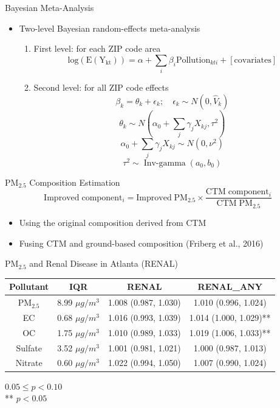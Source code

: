 \documentclass[handout]{beamer} %
\begin{document}
\begin{frame}{Bayesian Meta-Analysis}
    \begin{itemize}
       \item Two-level Bayesian random-effects meta-analysis
        \begin{enumerate}
            \item First level: for each ZIP code area$$ \mathrm{log(E(Y_{kt}))}=\alpha+\sum_i\beta_i\mathrm{Pollution}_{kti}+[\mathrm{covariates}]$$
            \item Second level: for all ZIP code effects
            $$\beta_k=\theta_k+\epsilon_k; \quad \epsilon_k\sim N(0, \hat{V}_k)$$
            $$\theta_k\sim N(\alpha_0+\sum_j\gamma_jX_{kj}, \tau^2)$$
            $$\alpha_0+\sum_j\gamma_jX_{kj} \sim N(0, \nu^2)$$
            $$\tau^2\sim \operatorname{Inv-gamma}(a_0, b_0)$$
        \end{enumerate}
    \end{itemize}
\end{frame}

\begin{frame}{PM$_{2.5}$ Composition Estimation}
    \begin{equation*}
        \mathrm{Improved\;component_\mathit{i}=Improved\;PM_{2.5}\times\frac{CTM\;component_\mathit{i}}{CTM\;PM_{2.5}}}
    \end{equation*}
    \begin{itemize}
        \item Using the original composition derived from CTM
        \item Fusing CTM and ground-based composition (Friberg et al., 2016)
    \end{itemize}
\end{frame}

\begin{frame}{PM$_{2.5}$ and Renal Disease in Atlanta (RENAL)}
    \begin{table}
        \small
        \centering
        \begin{tabular}{c|c|c|c}
            \hline
            Pollutant & IQR & RENAL & RENAL\_ANY \\
            \hline
            PM$_{2.5}$ & 8.99 $\mu g/m^3$ & 1.008 (0.987, 1.030) & 1.010 (0.996, 1.024) \\
            EC & 0.68 $\mu g/m^3$ & 1.016 (0.993, 1.039) & 1.014 (1.000, 1.029)** \\
            OC & 1.75 $\mu g/m^3$ & 1.010 (0.989, 1.033) & 1.019 (1.006, 1.033)** \\
            Sulfate & 3.52 $\mu g/m^3$ & 1.001 (0.981, 1.021) & 1.000 (0.987, 1.013) \\
            Nitrate & 0.60 $\mu g/m^3$ & 1.022 (0.994, 1.050) & 1.007 (0.990, 1.024) \\
            \hline
        \end{tabular}
    \end{table}
    {\footnotesize * $0.05 \leq p < 0.10$ \\ ** $p < 0.05$}
\end{frame}
\end{document}
